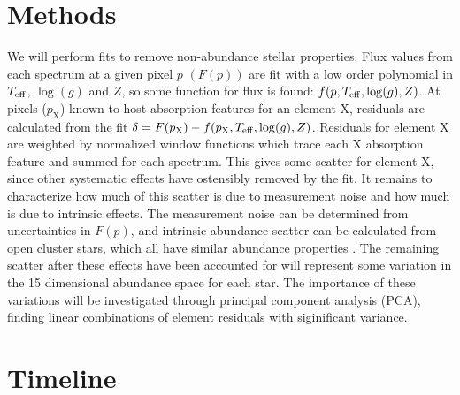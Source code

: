 \documentclass[preprint]{aastex}
\begin{document}
\section{Methods}
\label{sec:methods}
We will perform fits to remove non-abundance stellar properties. Flux values from each spectrum at a given pixel $p$ $(F(p))$ are fit with a low order polynomial in $T_{\rm eff}$, $\log(g)$ and $Z$, so some function for flux is found: $f(p,T_{\rm eff},\log(g),Z)$. At pixels ($p_\mathrm{X}$) known to host absorption features for an element X, residuals are calculated from the fit $\delta = F(p_\mathrm{X}) - f(p_\mathrm{X},T_{\rm eff},\log(g),Z)$. Residuals for element X are weighted by normalized window functions which trace each X absorption feature and summed for each spectrum. This gives some scatter for element X, since other systematic effects have ostensibly removed by the fit. It remains to characterize how much of this scatter is due to measurement noise and how much is due to intrinsic effects. The measurement noise can be determined from uncertainties in $F(p)$, and intrinsic abundance scatter can be calculated from open cluster stars, which all have similar abundance properties \citep{meszaros2015}. The remaining scatter after these effects have been accounted for will represent some variation in the 15 dimensional abundance space for each star. The importance of these variations will be investigated through principal component analysis (PCA), finding linear combinations of element residuals with siginificant variance.

\section{Timeline}
\label{sec:timeline}
\end{document}
